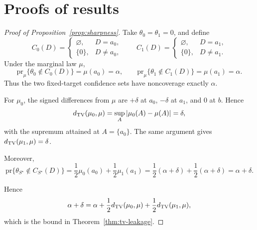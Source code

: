 \documentclass[11pt]{article}
\begin{document}
\section{Proofs of results}
\label{app:proofs}

\begin{proof}[Proof of Proposition~\ref{prop:sharpness}]
	Take \(\theta_0=\theta_1=0\), and define
	\[
	C_0(D)=
	\begin{cases}
		\varnothing, & D=a_0,\\
		\{0\}, & D\neq a_0,
	\end{cases}
	\qquad
	C_1(D)=
	\begin{cases}
		\varnothing, & D=a_1,\\
		\{0\}, & D\neq a_1 .
	\end{cases}
	\]
	Under the marginal law \(\mu\),
	\[
	\mathrm{pr}_{\mu}\{\theta_0\notin C_0(D)\}=\mu(a_0)=\alpha,
	\qquad
	\mathrm{pr}_{\mu}\{\theta_1\notin C_1(D)\}=\mu(a_1)=\alpha.
	\]
	Thus the two fixed-target confidence sets have noncoverage exactly \(\alpha\).
	
	For \(\mu_0\), the signed differences from \(\mu\) are \(+\delta\) at \(a_0\),
	\(-\delta\) at \(a_1\), and \(0\) at \(b\). Hence
	\[
	d_{\rm TV}(\mu_0,\mu)
	=
	\sup_A|\mu_0(A)-\mu(A)|
	=
	\delta,
	\]
	with the supremum attained at \(A=\{a_0\}\). The same argument gives
	\(d_{\rm TV}(\mu_1,\mu)=\delta\).
	
	Moreover,
	\[
	\text{pr}\{\theta_{S^\star}\notin C_{S^\star}(D)\}
	=
	\frac12\mu_0(a_0)+\frac12\mu_1(a_1)
	=
	\frac12(\alpha+\delta)+\frac12(\alpha+\delta)
	=
	\alpha+\delta.
	\]
	
	Hence
	\[
	\alpha+\delta
	=
	\alpha+
	\frac12 d_{\rm TV}(\mu_0,\mu)
	+
	\frac12 d_{\rm TV}(\mu_1,\mu),
	\]
	which is the bound in Theorem~\ref{thm:tv-leakage}.
\end{proof}
\end{document}
